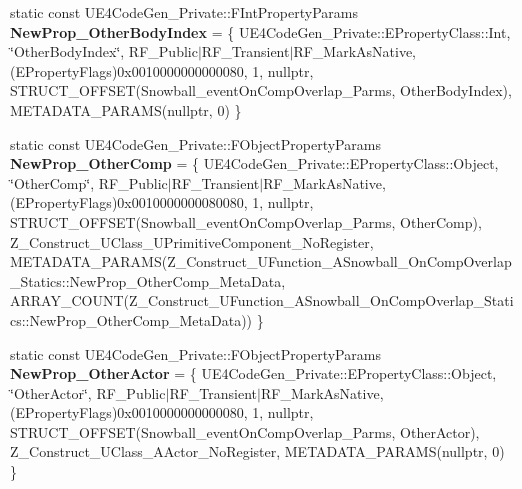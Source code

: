\begin{DoxyCompactItemize}
static const U\+E4\+Code\+Gen\+\_\+\+Private\+::\+F\+Int\+Property\+Params {\bfseries New\+Prop\+\_\+\+Other\+Body\+Index} = \{ U\+E4\+Code\+Gen\+\_\+\+Private\+::\+E\+Property\+Class\+::\+Int, \char`\"{}Other\+Body\+Index\char`\"{}, R\+F\+\_\+\+Public$\vert$R\+F\+\_\+\+Transient$\vert$R\+F\+\_\+\+Mark\+As\+Native, (E\+Property\+Flags)0x0010000000000080, 1, nullptr, S\+T\+R\+U\+C\+T\+\_\+\+O\+F\+F\+S\+E\+T(\+Snowball\+\_\+event\+On\+Comp\+Overlap\+\_\+\+Parms, Other\+Body\+Index), M\+E\+T\+A\+D\+A\+T\+A\+\_\+\+P\+A\+R\+A\+M\+S(nullptr, 0) \}
\item 
\mbox{\label{struct_z___construct___u_function___a_snowball___on_comp_overlap___statics_ab5dc3f1db660dfbcb24506e4250a1461}} 
static const U\+E4\+Code\+Gen\+\_\+\+Private\+::\+F\+Object\+Property\+Params {\bfseries New\+Prop\+\_\+\+Other\+Comp} = \{ U\+E4\+Code\+Gen\+\_\+\+Private\+::\+E\+Property\+Class\+::\+Object, \char`\"{}Other\+Comp\char`\"{}, R\+F\+\_\+\+Public$\vert$R\+F\+\_\+\+Transient$\vert$R\+F\+\_\+\+Mark\+As\+Native, (E\+Property\+Flags)0x0010000000080080, 1, nullptr, S\+T\+R\+U\+C\+T\+\_\+\+O\+F\+F\+S\+E\+T(\+Snowball\+\_\+event\+On\+Comp\+Overlap\+\_\+\+Parms, Other\+Comp), Z\+\_\+\+Construct\+\_\+\+U\+Class\+\_\+\+U\+Primitive\+Component\+\_\+\+No\+Register, M\+E\+T\+A\+D\+A\+T\+A\+\_\+\+P\+A\+R\+A\+M\+S(\+Z\+\_\+\+Construct\+\_\+\+U\+Function\+\_\+\+A\+Snowball\+\_\+\+On\+Comp\+Overlap\+\_\+\+Statics\+::\+New\+Prop\+\_\+\+Other\+Comp\+\_\+\+Meta\+Data, A\+R\+R\+A\+Y\+\_\+\+C\+O\+U\+N\+T(\+Z\+\_\+\+Construct\+\_\+\+U\+Function\+\_\+\+A\+Snowball\+\_\+\+On\+Comp\+Overlap\+\_\+\+Statics\+::\+New\+Prop\+\_\+\+Other\+Comp\+\_\+\+Meta\+Data)) \}
\item 
\mbox{\label{struct_z___construct___u_function___a_snowball___on_comp_overlap___statics_a536e8fbc6d786624c018befc7d85dd5e}} 
static const U\+E4\+Code\+Gen\+\_\+\+Private\+::\+F\+Object\+Property\+Params {\bfseries New\+Prop\+\_\+\+Other\+Actor} = \{ U\+E4\+Code\+Gen\+\_\+\+Private\+::\+E\+Property\+Class\+::\+Object, \char`\"{}Other\+Actor\char`\"{}, R\+F\+\_\+\+Public$\vert$R\+F\+\_\+\+Transient$\vert$R\+F\+\_\+\+Mark\+As\+Native, (E\+Property\+Flags)0x0010000000000080, 1, nullptr, S\+T\+R\+U\+C\+T\+\_\+\+O\+F\+F\+S\+E\+T(\+Snowball\+\_\+event\+On\+Comp\+Overlap\+\_\+\+Parms, Other\+Actor), Z\+\_\+\+Construct\+\_\+\+U\+Class\+\_\+\+A\+Actor\+\_\+\+No\+Register, M\+E\+T\+A\+D\+A\+T\+A\+\_\+\+P\+A\+R\+A\+M\+S(nullptr, 0) \}

\end{DoxyCompactItemize}

